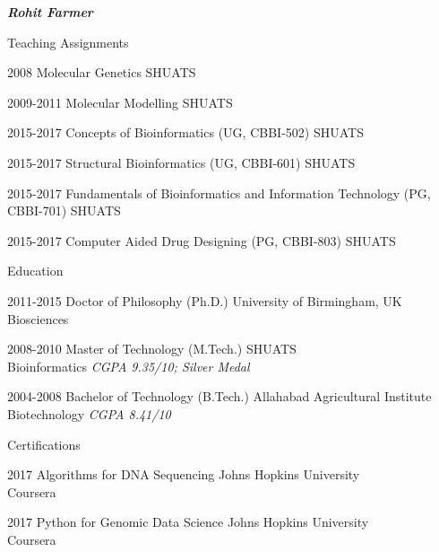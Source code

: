 \documentclass[10pt]{article}
\begin{document}
\begin{cv}{\huge \it \bfseries Rohit Farmer}
\begin{cvlist}{Teaching Assignments}
	\item[2008] Molecular Genetics \hfill SHUATS 
	\item[2009-2011] Molecular Modelling  \hfill SHUATS 
	\item[2015-2017] Concepts of Bioinformatics (UG, CBBI-502) \hfill SHUATS 
	\item[2015-2017] Structural Bioinformatics (UG, CBBI-601)  \hfill SHUATS 
	\item[2015-2017] Fundamentals of Bioinformatics and Information Technology (PG, CBBI-701) \hfill SHUATS 
	\item[2015-2017] Computer Aided Drug Designing (PG, CBBI-803) \hfill SHUATS
\end{cvlist}

\begin{cvlist}{Education}
	\item[2011-2015] Doctor of Philosophy (Ph.D.) \hfill University of Birmingham, UK \\ Biosciences
	\item[2008-2010] Master of Technology (M.Tech.) \hfill SHUATS  \\ Bioinformatics \emph{CGPA 9.35/10; Silver Medal}
	\item[2004-2008] Bachelor of Technology (B.Tech.) \hfill Allahabad Agricultural Institute  \\ Biotechnology \emph{CGPA 8.41/10}
\end{cvlist}

\begin{cvlist}{Certifications}
	\item[2017] Algorithms for DNA Sequencing \hfill Johns Hopkins University  \\ \hspace*{\fill} Coursera
	\item[2017] Python for Genomic Data Science \hfill Johns Hopkins University  \\ \hspace*{\fill} Coursera
\end{cvlist}


\end{cv}
\end{document}
